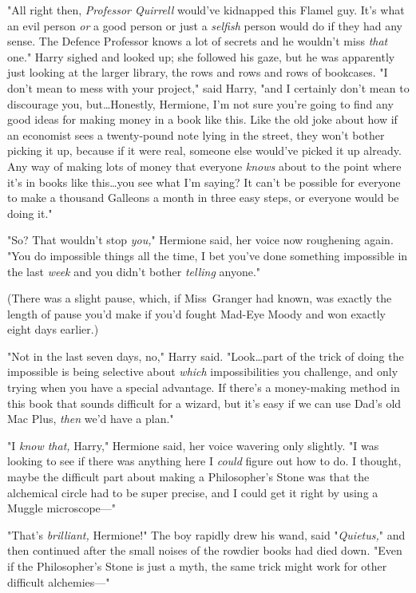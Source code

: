 "All right then, \emph{Professor Quirrell} would’ve kidnapped this Flamel guy.
It’s what an evil person \emph{or} a good person or just a \emph{selfish}
person would do if they had any sense. The Defence Professor knows a lot of
secrets and he wouldn’t miss \emph{that} one." Harry sighed and looked up; she
followed his gaze, but he was apparently just looking at the larger library,
the rows and rows and rows of bookcases. "I don’t mean to mess with your
project," said Harry, "and I certainly don’t mean to discourage you,
but…Honestly, Hermione, I’m not sure you’re going to find any good
ideas for making money in a book like this. Like the old joke about how if an
economist sees a twenty-pound note lying in the street, they won’t bother
picking it up, because if it were real, someone else would’ve picked it up
already. Any way of making lots of money that everyone \emph{knows} about to
the point where it’s in books like this…you see what I’m saying? It
can’t be possible for everyone to make a thousand Galleons a month in three
easy steps, or everyone would be doing it."

"So? That wouldn’t stop \emph{you,}" Hermione said, her voice now roughening
again. "You do impossible things all the time, I bet you’ve done something
impossible in the last \emph{week} and you didn’t bother \emph{telling} anyone."

(There was a slight pause, which, if Miss~Granger had known, was exactly the
length of pause you’d make if you’d fought Mad-Eye Moody and won exactly eight
days earlier.)

"Not in the last seven days, no," Harry said. "Look…part of the trick
of doing the impossible is being selective about \emph{which} impossibilities
you challenge, and only trying when you have a special advantage. If there’s a
money-making method in this book that sounds difficult for a wizard, but it’s
easy if we can use Dad’s old Mac Plus, \emph{then} we’d have a plan."

"I \emph{know that,} Harry," Hermione said, her voice wavering only slightly.
"I was looking to see if there was anything here I \emph{could} figure out how
to do. I thought, maybe the difficult part about making a Philosopher’s Stone
was that the alchemical circle had to be super precise, and I could get it
right by using a Muggle microscope—"

"That’s \emph{brilliant,} Hermione!" The boy rapidly drew his wand, said
"\emph{Quietus,}" and then continued after the small noises of the rowdier
books had died down. "Even if the Philosopher’s Stone is just a myth, the same
trick might work for other difficult alchemies—"

